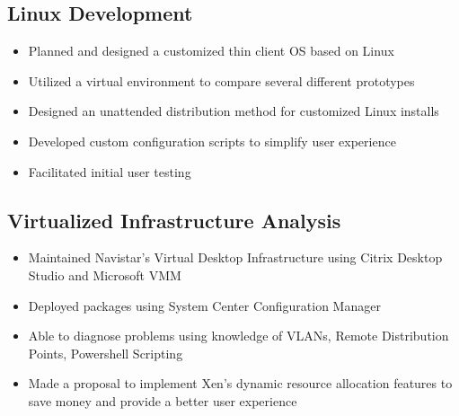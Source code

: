 \documentclass[letterpaper]{resume}
\newenvironment{nitemize}{%
  \begin{itemize}[topsep=0pt,itemsep=0pt,parsep=0pt]%
}{%
  \end{itemize}%
}
\begin{document}
\maketitle

\subsection{Linux Development}
\begin{nitemize}
\item Planned and designed a customized thin client OS based on Linux
\item Utilized a virtual environment to compare several different prototypes
\item Designed an unattended distribution method for customized Linux installs
\item Developed custom configuration scripts to simplify user experience
\item Facilitated initial user testing
\end{nitemize}
\subsection{Virtualized Infrastructure Analysis}
\begin{nitemize}
\item Maintained Navistar's Virtual Desktop Infrastructure using Citrix Desktop Studio and Microsoft VMM
\item Deployed packages using System Center Configuration Manager
\item Able to diagnose problems using knowledge of VLANs, Remote Distribution Points, Powershell Scripting
\item Made a proposal to implement Xen's dynamic resource allocation features to save money and provide a better user experience
\end{nitemize}
\end{document}
